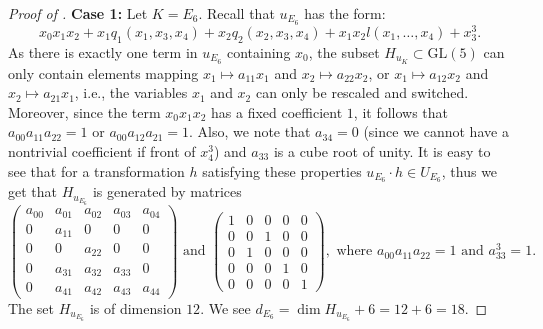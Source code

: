 \documentclass[10pt,a4paper]{amsart}
\newcommand{\GL}{\mathrm{GL}}
\begin{document}
\begin{proof}[Proof of ]
      \smallskip
      
    \noindent\textbf{Case 1: }Let $K=E_6$. Recall that $u_{E_6}$ has the form:
    \[
        x_0x_1x_2+x_1q_1(x_1,x_3,x_4)+ x_2q_2(x_2,x_3,x_4)+x_1x_2l(x_1,\ldots,x_4)+x_3^3.
    \]
    As there is exactly one term in $u_{E_6}$ containing $x_0$, the subset $H_{u_K}\subset \GL(5)$ can only contain elements mapping $x_1\mapsto a_{11}x_1$ and $x_2\mapsto a_{22}x_2$, or $x_1\mapsto a_{12}x_2$ and $x_2\mapsto a_{21}x_1$, i.e., the variables $x_1$ and $x_2$ can only be rescaled and switched. 
    Moreover, since the term $x_0x_1x_2$ has a fixed coefficient $1$, it follows that $a_{00}a_{11}a_{22}=1$ or $a_{00}a_{12}a_{21}=1$. 
    Also, we note that $a_{34}=0$ (since we cannot have a nontrivial coefficient if front of $x_4^3$) and $a_{33}$ is a cube root of unity. 
    It is easy to see that for a transformation $h$ satisfying these properties $u_{E_6}\cdot h\in U_{E_6}$, thus we get that $H_{u_{E_6}}$ is generated by matrices    
    $$
    \begin{pmatrix}
        a_{00} & a_{01} & a_{02} & a_{03} & a_{04}\\
             0 & a_{11} &      0 &      0 &      0\\
             0 &      0 & a_{22} &      0 &      0\\
             0 & a_{31} & a_{32} & a_{33} &      0\\
             0 & a_{41} & a_{42} & a_{43} & a_{44}
    \end{pmatrix} \text{ and }
    \begin{pmatrix}
             1 &      0 &      0 &      0 &      0\\
             0 &      0 &      1 &      0 &      0\\
             0 &      1 &      0 &      0 &      0\\
             0 &      0 &      0 &      1 &      0\\
             0 &      0 &      0 &      0 &      1
    \end{pmatrix}, \text{ where } a_{00}a_{11}a_{22}=1 \text{ and } a_{33}^3=1.
    $$
    The set $H_{u_{E_6}}$ is of dimension $12$. We see $d_{E_6}=\dim H_{u_{E_6}}+6=12+6=18$.

    \medskip    


\end{proof}
\end{document}
